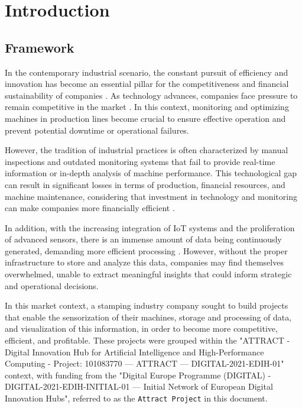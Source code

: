 \chapter{Introduction}\label{cap:intro}

\section{Framework}

In the contemporary industrial scenario, the constant pursuit of efficiency and innovation has become an essential pillar for the competitiveness and financial sustainability of companies \cite{Bonilla2018}. As technology advances, companies face pressure to remain competitive in the market \cite{ashraf2020optimization}. In this context, monitoring and optimizing machines in production lines become crucial to ensure effective operation and prevent potential downtime or operational failures.

However, the tradition of industrial practices is often characterized by manual inspections and outdated monitoring systems that fail to provide real-time information or in-depth analysis of machine performance. This technological gap can result in significant losses in terms of production, financial resources, and machine maintenance, considering that investment in technology and monitoring can make companies more financially efficient \cite{mabad2021rfid}.

In addition, with the increasing integration of IoT systems and the proliferation of advanced sensors, there is an immense amount of data being continuously generated, demanding more efficient processing \cite{bajaj2021iot}. However, without the proper infrastructure to store and analyze this data, companies may find themselves overwhelmed, unable to extract meaningful insights that could inform strategic and operational decisions.

In this market context, a stamping industry company sought to build projects that enable the sensorization of their machines, storage and processing of data, and visualization of this information, in order to become more competitive, efficient, and profitable. These projects were grouped within the "ATTRACT - Digital Innovation Hub for Artificial Intelligence and High-Performance Computing - Project: 101083770 — ATTRACT — DIGITAL-2021-EDIH-01" context, with funding from the "Digital Europe Programme (DIGITAL) - DIGITAL-2021-EDIH-INITIAL-01 — Initial Network of European Digital Innovation Hubs", referred to as the \texttt{Attract Project} in this document.

